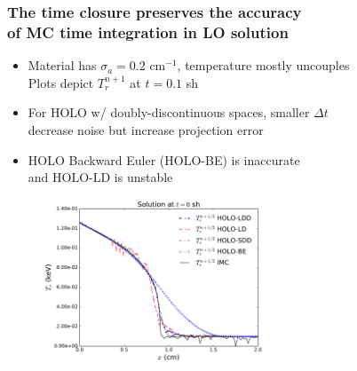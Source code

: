 \documentclass[xcolor=dvipsnames,hyperref={pdfpagelabels=false},unknownkeysallowed]{beamer}
\newcommand{\colG}[1]{{\color{Gray!110} #1}}
\newlength{\wideitemsep}
\let\olditem\item
\renewcommand{\item}{\setlength{\itemsep}{\wideitemsep}\olditem}
\begin{document}
\begin{frame}
    \frametitle{The time closure preserves the accuracy \\ of MC time
    integration in LO solution} %
    \fontsize{10.0pt}{10.0pt}\selectfont
    \vspace{0.1in}
    \begin{itemize}
        \item Material has $\sigma_a = 0.2$ cm$^{-1}$, temperature mostly uncouples  \\
            \colG{Plots depict $T_{r}^{n+1}$ at $t=0.1$ sh}
        \item For HOLO w/ doubly-discontinuous spaces, smaller $\Delta t$ \\ decrease noise but increase projection error
        \item HOLO Backward Euler (HOLO-BE) is inaccurate
            \\ \colG{and HOLO-LD is unstable}
    \end{itemize}
\begin{figure}[H]
  \centering
    \includegraphics[width=0.590\textwidth]{thin_temp_compare.pdf}
\end{figure}
\end{frame}
\end{document}
